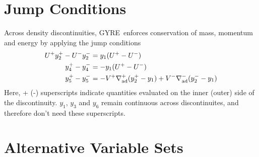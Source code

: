 \documentclass[fleqn]{article}
\newcommand{\gyre}{GYRE}
\newcommand{\nabad}{\nabla_{\rm ad}}
\begin{document}
\section*{Jump Conditions}

Across density discontinuities, \gyre\ enforces conservation of mass,
momentum and energy by applying the jump conditions
\begin{align*}
U^{+} y_{2}^{+} - U^{-} y_{2}^{-} &= y_{1} (U^{+} - U^{-}) \\
y_{4}^{+} - y_{4}^{-} &= -y_{1} (U^{+} - U^{-}) \\
y_{5}^{+} - y_{5}^{-} &= - V^{+} \nabad^{+} (y_{2}^{+} - y_{1}) +
V^{-} \nabad^{-} (y_{2}^{-} - y_{1})
\end{align*}
Here, + (-) superscripts indicate quantities evaluated on the inner
(outer) side of the discontinuity. $y_{1}$, $y_{3}$ and $y_{6}$ remain
continuous across discontinuites, and therefore don't need these
superscripts.

\section*{Alternative Variable Sets}
\end{document}
